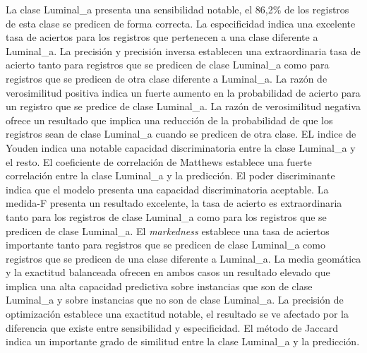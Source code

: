 La clase Luminal\_a presenta una sensibilidad notable, el 86,2\% de los registros de esta clase se predicen de forma correcta. La especificidad indica una excelente tasa de aciertos para los registros que pertenecen a una clase diferente a Luminal\_a. La precisión y precisión inversa establecen una extraordinaria tasa de acierto tanto para registros que se predicen de clase Luminal\_a como para registros que se predicen de otra clase diferente a Luminal\_a. La razón de verosimilitud positiva indica un fuerte aumento en la probabilidad de acierto para un registro que se predice de clase Luminal\_a. La razón de verosimilitud negativa ofrece un resultado que implica una reducción de la probabilidad de que los registros sean de clase Luminal\_a cuando se predicen de otra clase. EL indice de Youden indica una notable capacidad discriminatoria entre la clase Luminal\_a y el resto. El coeficiente de correlación de Matthews establece una fuerte correlación entre la clase Luminal\_a y la predicción. El poder discriminante indica que el modelo presenta una capacidad discriminatoria aceptable. La medida-F presenta un resultado excelente, la tasa de acierto es extraordinaria tanto para los registros de clase Luminal\_a como para los registros que se predicen de clase Luminal\_a. El \textit{markedness} establece una tasa de aciertos importante tanto para registros que se predicen de clase Luminal\_a como registros que se predicen de una clase diferente a Luminal\_a. La media geomática y la exactitud balanceada ofrecen en ambos casos un resultado elevado que implica una alta capacidad predictiva sobre instancias que son de clase Luminal\_a y sobre instancias que no son de clase Luminal\_a. La precisión de optimización establece una exactitud notable, el resultado se ve afectado por la diferencia que existe entre sensibilidad y especificidad. El método de Jaccard indica un importante grado de similitud entre la clase Luminal\_a y la predicción.

\bigbreak

